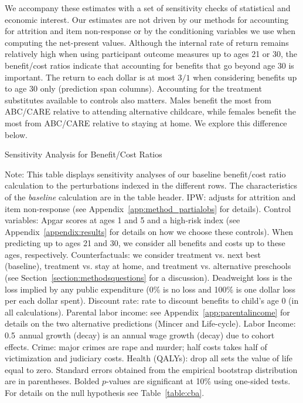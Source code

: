 We accompany these estimates with a set of sensitivity checks of statistical and economic interest. Our estimates are not driven by our methods for accounting for attrition and item non-response or by the conditioning variables we use when computing the net-present values. Although the internal rate of return remains relatively high when using participant outcome measures up to ages 21 or 30, the benefit/cost ratios indicate that accounting for benefits that go beyond age 30 is important. The return to each dollar is at most $3/1$ when considering benefits up to age 30 only (prediction span columns). Accounting for the treatment substitutes available to controls also matters. Males benefit the most from ABC/CARE relative to attending alternative childcare, while females benefit the most from ABC/CARE relative to staying at home. We explore this difference below.

\begin{table}
\begin{threeparttable}
\caption{Sensitivity Analysis for Benefit/Cost Ratios}
\label{table:bcsens}
\centering
\scriptsize

\begin{tablenotes}
\scriptsize
\item Note: This table displays sensitivity analyses of our baseline benefit/cost ratio calculation to the perturbations indexed in the different rows. The characteristics of the \textit{baseline} calculation are in the table header. IPW: adjusts for attrition and item non-response (see  Appendix~\ref{app:method_partialobs} for details). Control variables: Apgar scores at ages 1 and 5 and a high-risk index (see  Appendix~\ref{appendix:results} for details on how we choose these controls). When predicting up to ages 21 and 30, we consider all benefits and costs up to these ages, respectively. Counterfactuals: we consider treatment vs. next best (baseline), treatment vs. stay at home, and treatment vs. alternative preschools (see Section~\ref{section:methodsquestions} for a discussion). Deadweight loss is the loss implied by any public expenditure (0\% is no loss and 100\% is one dollar loss per each dollar spent). Discount rate: rate to discount benefits to child's age 0 (in all calculations). Parental labor income: see  Appendix~\ref{app:parentalincome} for details on the two alternative predictions (Mincer and Life-cycle). Labor Income: 0.5\ annual growth (decay) is an annual wage growth (decay) due to cohort effects. Crime: major crimes are rape and murder; half costs takes half of victimization and judiciary costs. Health (QALYs): drop all sets the value of life equal to zero. Standard errors obtained from the empirical bootstrap distribution are in parentheses. Bolded $p$-values are significant at 10\% using one-sided tests. For details on the null hypothesis see Table~\ref{table:cba}.
\end{tablenotes}
\end{threeparttable}
\end{table}

